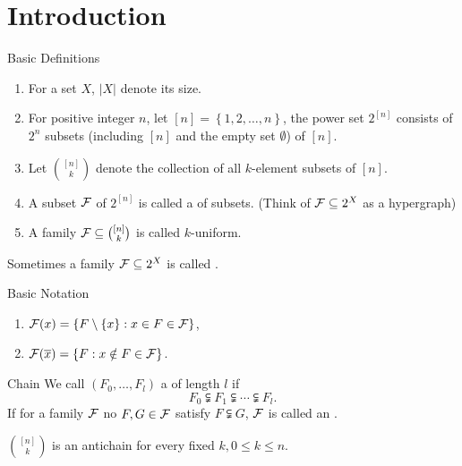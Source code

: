 \section{Introduction}

\begin{definition}[def:]{Basic Definitions}
    \begin{enumerate}
        \item For a set $X$, $|X|$ denote its size.
        \item For positive integer $n$, let $[n]=\left\{1,2,\dots ,n\right\}$, the power set $2^{[n]}$ consists of $2^n$ subsets (including $[n]$ and the empty set $\emptyset $) of $[n]$.
        \item Let ${[n]\choose k}$ denote the collection of all $k$-element subsets of $[n]$.
        \item A subset $\mathcal{F}$ of $2^{[n]}$ is called a  of subsets. (Think of $\mathcal{F}\subseteq 2^X$ as a hypergraph)
        \item A family $\mathcal{F}\subseteq {[n]\choose k}$ is called $k$-uniform.
    \end{enumerate}
\end{definition}

\begin{remark}
    Sometimes a family $\mathcal{F}\subseteq 2^X$ is called .
\end{remark}

\begin{notation}[ntt:]{Basic Notation}
    \begin{enumerate}
        \item $\mathcal{F}(x)=\left\{F\setminus \left\{x\right\}:x\in F\in \mathcal{F}\right\}$,
        \item $\mathcal{F}(\overline{x})=\left\{F:x\notin F\in \mathcal{F}\right\}$.
    \end{enumerate}
\end{notation}

\begin{definition}[def:]{Chain}
    We call $(F_0,\dots ,F_l)$ a  of length $l$ if
    \[F_0\subsetneqq F_1\subsetneqq \cdots \subsetneqq F_l.\]
    If for a family $\mathcal{F}$ no $F,G\in \mathcal{F}$ satisfy $F\subsetneqq G$, $\mathcal{F}$ is called an .
\end{definition}

\begin{remark}
    ${[n]\choose k}$ is an antichain for every fixed $k, 0\leq k\leq n$.
\end{remark}

